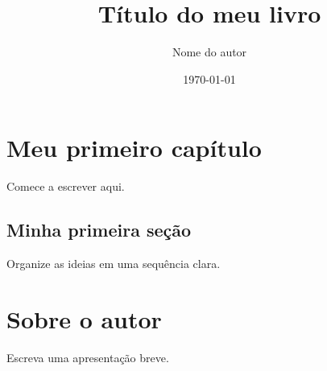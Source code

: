 \documentclass[11pt,openany]{book}
\title{Título do meu livro}
\author{Nome do autor}
\date{\today}
\begin{document}
\frontmatter
\maketitle
\tableofcontents

\mainmatter
\chapter{Meu primeiro capítulo}
Comece a escrever aqui.

\section{Minha primeira seção}
Organize as ideias em uma sequência clara.

\backmatter
\chapter*{Sobre o autor}
Escreva uma apresentação breve.
\end{document}
